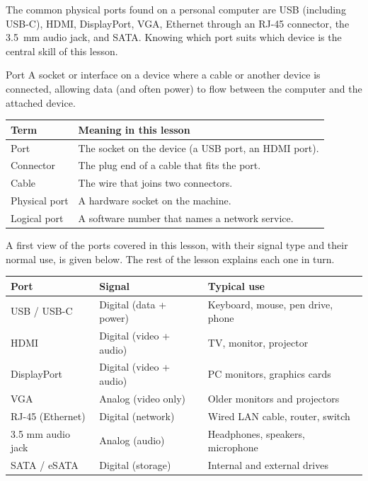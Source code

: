 The common physical ports found on a personal computer are USB (including
USB-C), HDMI, DisplayPort, VGA, Ethernet through an RJ-45 connector, the
3.5~mm audio jack, and SATA. Knowing which port suits which device is the
central skill of this lesson.

\begin{definitionbox}{Port}
A socket or interface on a device where a cable or another device is
connected, allowing data (and often power) to flow between the computer and
the attached device.
\end{definitionbox}

\begin{center}
\begin{tabular}{p{}p{}}
\toprule
\textbf{Term} & \textbf{Meaning in this lesson} \\
\midrule
Port & The socket on the device (a USB port, an HDMI port). \\
Connector & The plug end of a cable that fits the port. \\
Cable & The wire that joins two connectors. \\
Physical port & A hardware socket on the machine. \\
Logical port & A software number that names a network service. \\
\bottomrule
\end{tabular}
\end{center}

A first view of the ports covered in this lesson, with their signal type and
their normal use, is given below. The rest of the lesson explains each one in
turn.

\begin{center}
\begin{tabular}{p{}p{}p{}}
\toprule
\textbf{Port} & \textbf{Signal} & \textbf{Typical use} \\
\midrule
USB / USB-C & Digital (data + power) & Keyboard, mouse, pen drive, phone \\
HDMI & Digital (video + audio) & TV, monitor, projector \\
DisplayPort & Digital (video + audio) & PC monitors, graphics cards \\
VGA & Analog (video only) & Older monitors and projectors \\
RJ-45 (Ethernet) & Digital (network) & Wired LAN cable, router, switch \\
3.5 mm audio jack & Analog (audio) & Headphones, speakers, microphone \\
SATA / eSATA & Digital (storage) & Internal and external drives \\
\bottomrule
\end{tabular}
\end{center}

